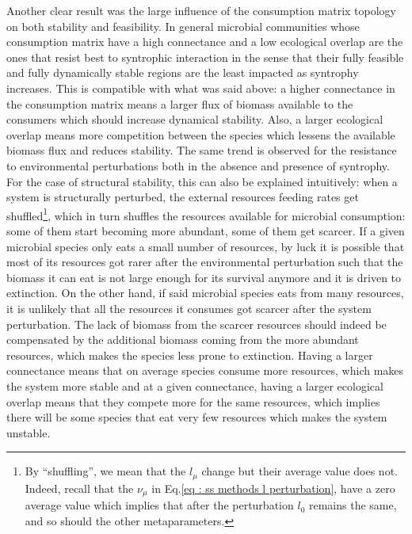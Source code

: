 \documentclass[12pt, titlepage]{report}
\begin{document}
Another clear result was the large influence of the consumption matrix topology on both stability and feasibility. In general microbial communities whose consumption matrix have a high connectance and a low ecological overlap are the ones that resist best to syntrophic interaction in the sense that their fully feasible and fully dynamically stable regions are the least impacted as syntrophy increases. This is compatible with what was said above: a higher connectance in the consumption matrix means a larger flux of biomass available to the consumers which should increase dynamical stability. Also, a larger ecological overlap means more competition between the species which lessens the available biomass flux and reduces stability.  The same trend is observed for the resistance to environmental perturbations both in the absence and presence of syntrophy. For the case of structural stability, this can also be explained intuitively: when a system is structurally perturbed, the external resources feeding rates get shuffled\footnote{By ``shuffling'', we mean that the $l_\mu$ change but their average value does not. Indeed, recall that the $\nu_\mu$ in Eq.\eqref{eq : ss methods l perturbation}, have a zero average value which implies that after the perturbation $l_0$ remains the same, and so should the other metaparameters.}, which in turn shuffles the resources available for microbial consumption: some of them start becoming more abundant, some of them get scarcer. If a given microbial species only eats a small number of resources, by luck it is possible that most of its resources got rarer after the environmental perturbation such that the biomass it can eat is not large enough for its survival anymore and it is driven to extinction. On the other hand, if said microbial species eats from many resources, it is unlikely that all the resources it consumes got scarcer after the system perturbation. The lack of biomass from the scarcer resources should indeed be compensated by the additional biomass coming from the more abundant resources, which makes the species less prone to extinction. Having a larger connectance means that on average species consume more resources, which makes the system more stable and at a given connectance, having a larger ecological overlap means that they compete more for the same resources, which implies there will be some species that eat very few resources which makes the system unstable.
\end{document}
